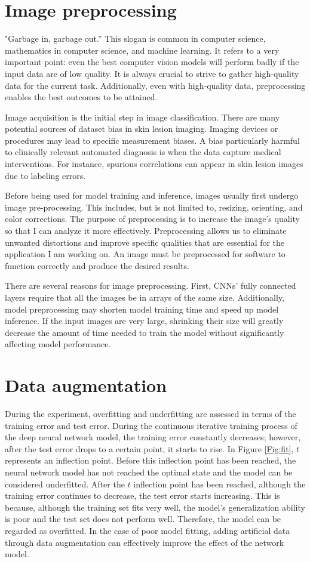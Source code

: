 \section{Image preprocessing}
"Garbage in, garbage out.” This slogan is common in computer science, mathematics in computer science, and machine learning. It refers to a very important point: even the best computer vision models will perform badly if the input data are of low quality. It is always crucial to strive to gather high-quality data for the current task. Additionally, even with high-quality data, preprocessing enables the best outcomes to be attained.

Image acquisition is the initial step in image classification. There are many potential sources of dataset bias in skin lesion imaging. Imaging devices or procedures may lead to specific measurement biases. A bias particularly harmful to clinically relevant automated diagnosis is when the data capture medical interventions. For instance, spurious correlations can appear in skin lesion images due to labeling errors.

Before being used for model training and inference, images usually first undergo image pre-processing. This includes, but is not limited to, resizing, orienting, and color corrections. The purpose of preprocessing is to increase the image's quality so that I can analyze it more effectively. Preprocessing allows us to eliminate unwanted distortions and improve specific qualities that are essential for the application I am working on. An image must be preprocessed for software to function correctly and produce the desired results.

There are several reasons for image preprocessing. First, CNNs' fully connected layers require that all the images be in arrays of the same size. Additionally, model preprocessing may shorten model training time and speed up model inference. If the input images are very large, shrinking their size  will greatly decrease the amount of time needed to train the model without significantly affecting model performance. 

\section{Data augmentation}
During the experiment, overfitting and underfitting are assessed in terms of the training error and test error. During the continuous iterative training process of the deep neural network model, the training error constantly decreases; however, after the test error drops to a certain point, it starts to rise. In Figure \ref{Fig:fit}, $t$ represents an inflection point. Before this inflection point has been reached, the neural network model has not reached the optimal state and the model can be considered underfitted. After the $t$ inflection point has been reached, although the training error continues to decrease, the test error starts increasing. This is because, although the training set fits very well, the model's generalization ability is poor and the test set does not perform well. Therefore, the model can be regarded as overfitted. In the case of poor model fitting, adding artificial data through data augmentation can effectively improve the effect of the network model.

